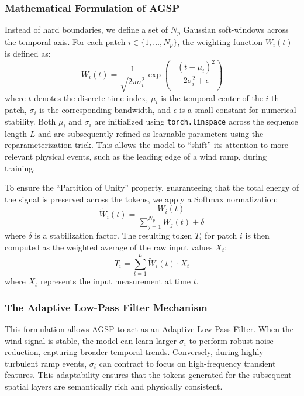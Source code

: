\subsubsection{Mathematical Formulation of AGSP}
\label{sec:agsp_math}
Instead of hard boundaries, we define a set of $N_p$ Gaussian soft-windows across the temporal axis. For each patch $i \in \{1, \dots, N_p\}$, the weighting function $W_i(t)$ is defined as:
\begin{equation}
W_i(t) = \frac{1}{\sqrt{2\pi\sigma_i^2}} \exp\left( -\frac{(t - \mu_i)^2}{2\sigma_i^2 + \epsilon} \right)
\end{equation}
where $t$ denotes the discrete time index, $\mu_i$ is the temporal center of the $i$-th patch, $\sigma_i$ is the corresponding bandwidth, and $\epsilon$ is a small constant for numerical stability. Both $\mu_i$ and $\sigma_i$ are initialized using \texttt{torch.linspace} across the sequence length $L$ and are subsequently refined as learnable parameters using the reparameterization trick. This allows the model to ``shift'' its attention to more relevant physical events, such as the leading edge of a wind ramp, during training.

To ensure the ``Partition of Unity'' property, guaranteeing that the total energy of the signal is preserved across the tokens, we apply a Softmax normalization:
\begin{equation}
\tilde{W}_i(t) = \frac{W_i(t)}{\sum_{j=1}^{N_p} W_j(t) + \delta}
\end{equation}
where $\delta$ is a stabilization factor. The resulting token $T_i$ for patch $i$ is then computed as the weighted average of the raw input values $X_t$:
\begin{equation}
T_i = \sum_{t=1}^L \tilde{W}_i(t) \cdot X_t
\end{equation}
where $X_t$ represents the input measurement at time $t$.

\subsubsection{The Adaptive Low-Pass Filter Mechanism}
\label{sec:agsp_filter}
This formulation allows AGSP to act as an Adaptive Low-Pass Filter. When the wind signal is stable, the model can learn larger $\sigma_i$ to perform robust noise reduction, capturing broader temporal trends. Conversely, during highly turbulent ramp events, $\sigma_i$ can contract to focus on high-frequency transient features. This adaptability ensures that the tokens generated for the subsequent spatial layers are semantically rich and physically consistent.

